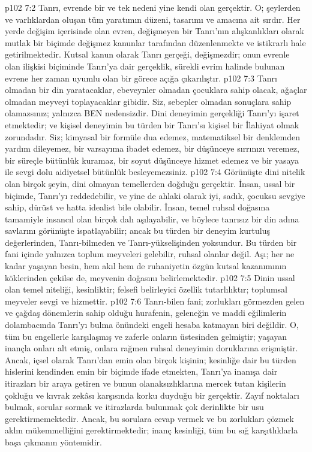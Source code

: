 \vs p102 7:2 Tanrı, evrende bir ve tek nedeni yine kendi olan gerçektir. O; şeylerden ve varlıklardan oluşan tüm yaratımın düzeni, tasarımı ve amacına ait sırdır. Her yerde değişim içerisinde olan evren, değişmeyen bir Tanrı’nın alışkanlıkları olarak mutlak bir biçimde değişmez kanunlar tarafından düzenlenmekte ve istikrarlı hale getirilmektedir. Kutsal kanun olarak Tanrı gerçeği, değişmezdir; onun evrenle olan ilişkisi biçiminde Tanrı’ya dair gerçeklik, sürekli evrim halinde bulunan evrene her zaman uyumlu olan bir görece açığa çıkarılıştır.
\vs p102 7:3 Tanrı olmadan bir din yaratacaklar, ebeveynler olmadan çocuklara sahip olacak, ağaçlar olmadan meyveyi toplayacaklar gibidir. Siz, sebepler olmadan sonuçlara sahip olamazsınız; yalnızca BEN nedensizdir. Dini deneyimin gerçekliği Tanrı’yı işaret etmektedir; ve kişisel deneyimin bu türden bir Tanrı’sı kişisel bir İlahiyat olmak zorundadır. Siz; kimyasal bir formüle dua edemez, matematiksel bir denklemden yardım dileyemez, bir varsayıma ibadet edemez, bir düşünceye sırrınızı veremez, bir süreçle bütünlük kuramaz, bir soyut düşünceye hizmet edemez ve bir yasaya ile sevgi dolu aidiyetsel bütünlük besleyemezsiniz.
\vs p102 7:4 Görünüşte dini nitelik olan birçok şeyin, dini olmayan temellerden doğduğu gerçektir. İnsan, ussal bir biçimde, Tanrı’yı reddedebilir, ve yine de ahlaki olarak iyi, sadık, çocuksu sevgiye sahip, dürüst ve hatta idealist bile olabilir. İnsan, temel ruhsal doğasına tamamiyle insancıl olan birçok dalı aşılayabilir, ve böylece tanrısız bir din adına savlarını görünüşte ispatlayabilir; ancak bu türden bir deneyim kurtuluş değerlerinden, Tanrı\hyp{}bilmeden ve Tanrı\hyp{}yükselişinden yoksundur. Bu türden bir fani içinde yalnızca toplum meyveleri gelebilir, ruhsal olanlar değil. Aşı; her ne kadar yaşayan besin, hem akıl hem de ruhaniyetin özgün kutsal kazanımının köklerinden çekilse de, meyvenin doğasını belirlemektedir.
\vs p102 7:5 Dinin ussal olan temel niteliği, kesinliktir; felsefi belirleyici özellik tutarlılıktır; toplumsal meyveler sevgi ve hizmettir.
\vs p102 7:6 Tanrı\hyp{}bilen fani; zorlukları görmezden gelen ve çağdaş dönemlerin sahip olduğu hurafenin, geleneğin ve maddi eğilimlerin dolambacında Tanrı’yı bulma önündeki engeli hesaba katmayan biri değildir. O, tüm bu engellerle karşılaşmış ve zaferle onların üstesinden gelmiştir; yaşayan inançla onları alt etmiş, onlara rağmen ruhsal deneyimin doruklarına erişmiştir. Ancak, içsel olarak Tanrı’dan emin olan birçok kişinin; kesinliğe dair bu türden hislerini kendinden emin bir biçimde ifade etmekten, Tanrı’ya inanışa dair itirazları bir araya getiren ve bunun olanaksızlıklarına mercek tutan kişilerin çokluğu ve kıvrak zekâsı karşısında korku duyduğu bir gerçektir. Zayıf noktaları bulmak, sorular sormak ve itirazlarda bulunmak çok derinlikte bir usu gerektirmemektedir. Ancak, bu sorulara cevap vermek ve bu zorlukları çözmek aklın mükemmelliğini gerektirmektedir; inanç kesinliği, tüm bu sığ karşıtlıklarla başa çıkmanın yöntemidir.
